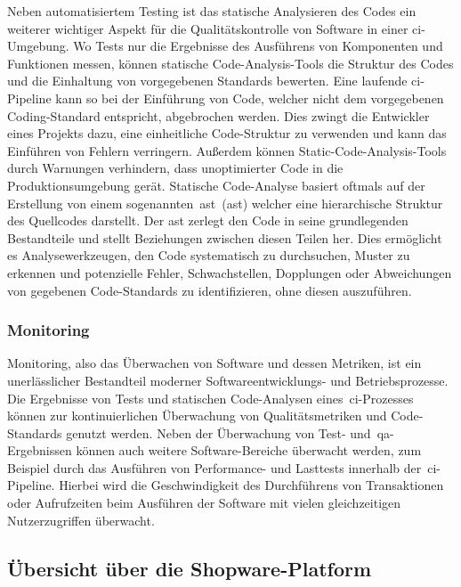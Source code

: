 Neben automatisiertem Testing ist das statische Analysieren des Codes ein weiterer wichtiger Aspekt für die
Qualitätskontrolle von Software in einer \acrshort{ci}-Umgebung.
Wo Tests nur die Ergebnisse des Ausführens von Komponenten und Funktionen messen, können statische
Code-Analysis-Tools die Struktur des Codes und die Einhaltung von vorgegebenen Standards bewerten.
Eine laufende \acrshort{ci}-Pipeline kann so bei der Einführung von Code, welcher nicht dem vorgegebenen Coding-Standard
entspricht, abgebrochen werden.
Dies zwingt die Entwickler eines Projekts dazu, eine einheitliche Code-Struktur zu verwenden und kann das Einführen
von Fehlern verringern.
Außerdem können Static-Code-Analysis-Tools durch Warnungen verhindern, dass unoptimierter Code in die
Produktionsumgebung gerät.
Statische Code-Analyse basiert oftmals auf der Erstellung von einem
sogenannten\ \glqq\acrlong{ast}\grqq\ (\acrshort{ast}) welcher eine hierarchische Struktur des Quellcodes darstellt.
Der \acrshort{ast} zerlegt den Code in seine grundlegenden Bestandteile und stellt Beziehungen zwischen diesen Teilen
her.
Dies ermöglicht es Analysewerkzeugen, den Code systematisch zu durchsuchen, Muster zu erkennen und potenzielle Fehler,
Schwachstellen, Dopplungen oder Abweichungen von gegebenen Code-Standards zu identifizieren, ohne diesen auszuführen.

\subsubsection{Monitoring}

Monitoring, also das Überwachen von Software und dessen Metriken, ist ein unerlässlicher Bestandteil moderner
Softwareentwicklungs- und Betriebsprozesse.
Die Ergebnisse von Tests und statischen Code-Analysen eines\ \acrshort{ci}-Prozesses können zur kontinuierlichen
Überwachung von Qualitätsmetriken und Code-Standards genutzt werden.
Neben der Überwachung von Test- und\ \acrshort{qa}-Ergebnissen können auch weitere Software-Bereiche überwacht werden,
zum Beispiel durch das Ausführen von Performance- und Lasttests innerhalb der\ \acrshort{ci}-Pipeline.
Hierbei wird die Geschwindigkeit des Durchführens von Transaktionen oder Aufrufzeiten beim Ausführen
der Software mit vielen gleichzeitigen Nutzerzugriffen überwacht.

\subsection{Übersicht über die Shopware-Platform} \label{subsec:02-background-3}


